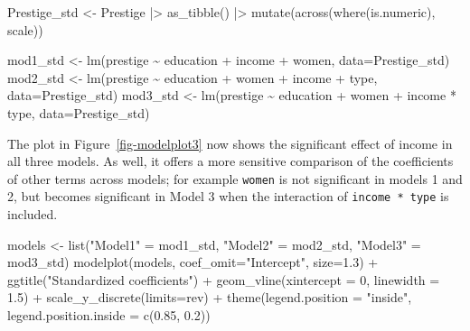 \documentclass[
  letterpaper,
  10pt,
  krantz2]{krantz}
\makeatletter
\newenvironment{Shaded}{\begin{snugshade}}{\end{snugshade}}
\newcommand{\AttributeTok}[1]{\textcolor[rgb]{0.40,0.45,0.13}{#1}}
\newcommand{\DecValTok}[1]{\textcolor[rgb]{0.68,0.00,0.00}{#1}}
\newcommand{\FloatTok}[1]{\textcolor[rgb]{0.68,0.00,0.00}{#1}}
\newcommand{\FunctionTok}[1]{\textcolor[rgb]{0.28,0.35,0.67}{#1}}
\newcommand{\NormalTok}[1]{\textcolor[rgb]{0.00,0.23,0.31}{#1}}
\newcommand{\OtherTok}[1]{\textcolor[rgb]{0.00,0.23,0.31}{#1}}
\newcommand{\SpecialCharTok}[1]{\textcolor[rgb]{0.37,0.37,0.37}{#1}}
\newcommand{\StringTok}[1]{\textcolor[rgb]{0.13,0.47,0.30}{#1}}
\newenvironment{kframe}{%
  \medskip{}
  \setlength{\fboxsep}{.8em}
  \def\at@end@of@kframe{}%
  \ifinner\ifhmode%
  \def\at@end@of@kframe{\end{minipage}}%
  \begin{minipage}{\columnwidth}%
  \fi\fi%
  \def\FrameCommand##1{\hskip\@totalleftmargin \hskip-\fboxsep
  \colorbox{shadecolor}{##1}\hskip-\fboxsep
      \hskip-\linewidth \hskip-\@totalleftmargin \hskip\columnwidth}%
  \MakeFramed {\advance\hsize-\width
    \@totalleftmargin\z@ \linewidth\hsize
    \@setminipage}}%
{\par\unskip\endMakeFramed%
  \at@end@of@kframe}
\renewenvironment{Shaded}{\begin{kframe}}{\end{kframe}}
\makeatother
\begin{document}
\begin{Shaded}
\begin{Highlighting}[]
\NormalTok{Prestige\_std }\OtherTok{\textless{}{-}}\NormalTok{ Prestige }\SpecialCharTok{|\textgreater{}}
  \FunctionTok{as\_tibble}\NormalTok{() }\SpecialCharTok{|\textgreater{}}
  \FunctionTok{mutate}\NormalTok{(}\FunctionTok{across}\NormalTok{(}\FunctionTok{where}\NormalTok{(is.numeric), scale))}

\NormalTok{mod1\_std }\OtherTok{\textless{}{-}} \FunctionTok{lm}\NormalTok{(prestige }\SpecialCharTok{\textasciitilde{}}\NormalTok{ education }\SpecialCharTok{+}\NormalTok{ income }\SpecialCharTok{+}\NormalTok{ women, }
               \AttributeTok{data=}\NormalTok{Prestige\_std)}
\NormalTok{mod2\_std }\OtherTok{\textless{}{-}} \FunctionTok{lm}\NormalTok{(prestige }\SpecialCharTok{\textasciitilde{}}\NormalTok{ education }\SpecialCharTok{+}\NormalTok{ women }\SpecialCharTok{+}\NormalTok{ income }\SpecialCharTok{+}\NormalTok{ type, }
               \AttributeTok{data=}\NormalTok{Prestige\_std)}
\NormalTok{mod3\_std }\OtherTok{\textless{}{-}} \FunctionTok{lm}\NormalTok{(prestige }\SpecialCharTok{\textasciitilde{}}\NormalTok{ education }\SpecialCharTok{+}\NormalTok{ women }\SpecialCharTok{+}\NormalTok{ income }\SpecialCharTok{*}\NormalTok{ type, }
               \AttributeTok{data=}\NormalTok{Prestige\_std)}
\end{Highlighting}
\end{Shaded}

The plot in Figure~\ref{fig-modelplot3} now shows the significant effect
of income in all three models. As well, it offers a more sensitive
comparison of the coefficients of other terms across models; for example
\texttt{women} is not significant in models 1 and 2, but becomes
significant in Model 3 when the interaction of \texttt{income\ *\ type}
is included.

\begin{Shaded}
\begin{Highlighting}[]
\NormalTok{models }\OtherTok{\textless{}{-}} \FunctionTok{list}\NormalTok{(}\StringTok{"Model1"} \OtherTok{=}\NormalTok{ mod1\_std, }\StringTok{"Model2"} \OtherTok{=}\NormalTok{ mod2\_std, }\StringTok{"Model3"} \OtherTok{=}\NormalTok{ mod3\_std)}
\FunctionTok{modelplot}\NormalTok{(models, }
          \AttributeTok{coef\_omit=}\StringTok{"Intercept"}\NormalTok{, }\AttributeTok{size=}\FloatTok{1.3}\NormalTok{) }\SpecialCharTok{+}
  \FunctionTok{ggtitle}\NormalTok{(}\StringTok{"Standardized coefficients"}\NormalTok{) }\SpecialCharTok{+}
  \FunctionTok{geom\_vline}\NormalTok{(}\AttributeTok{xintercept =} \DecValTok{0}\NormalTok{, }\AttributeTok{linewidth =} \FloatTok{1.5}\NormalTok{) }\SpecialCharTok{+}
  \FunctionTok{scale\_y\_discrete}\NormalTok{(}\AttributeTok{limits=}\NormalTok{rev) }\SpecialCharTok{+}
  \FunctionTok{theme}\NormalTok{(}\AttributeTok{legend.position =} \StringTok{"inside"}\NormalTok{,}
        \AttributeTok{legend.position.inside =} \FunctionTok{c}\NormalTok{(}\FloatTok{0.85}\NormalTok{, }\FloatTok{0.2}\NormalTok{))}
\end{Highlighting}
\end{Shaded}
\end{document}
